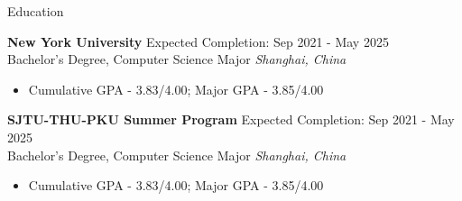 \documentclass{cv} %
\begin{document}

\begin{rSection}{Education}

	\textbf{New York University} \hfill Expected Completion: Sep 2021 - May 2025\\
	Bachelor's Degree, Computer Science Major \hfill \textit{Shanghai, China}
	\begin{itemize}
		\item Cumulative GPA - 3.83/4.00; Major GPA - 3.85/4.00
	\end{itemize}

	\textbf{SJTU-THU-PKU Summer Program} \hfill Expected Completion: Sep 2021 - May 2025\\
	Bachelor's Degree, Computer Science Major \hfill \textit{Shanghai, China}
	\begin{itemize}
		\item Cumulative GPA - 3.83/4.00; Major GPA - 3.85/4.00
	\end{itemize}
\end{rSection}

\end{document}
